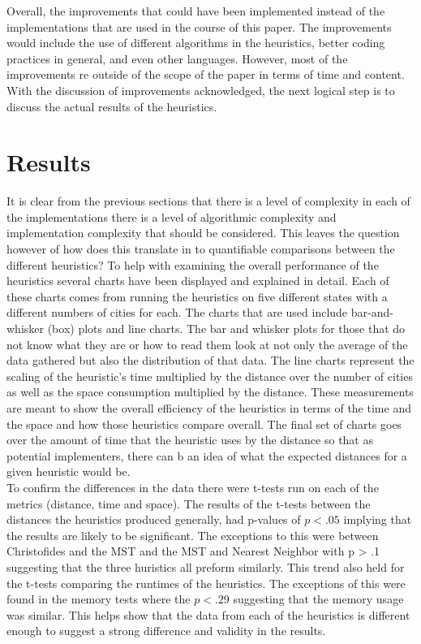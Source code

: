 \documentclass[midd]{thesis}
\newcommand{\tab}{\hspace*{2em}}
\begin{document}
\tab Overall, the improvements that could have been implemented instead of the implementations that are used in the course of this paper. The improvements would include the use of different algorithms in the heuristics, better coding practices in general, and even other languages. However, most of the improvements re outside of the scope of the paper in terms of time and content. With the discussion of improvements acknowledged, the next logical step is to discuss the actual results of the heuristics.

\chapter{Results}
\tab It is clear from the previous sections that there is a level of complexity in each of the implementations there is a level of algorithmic complexity and implementation complexity that should be considered. This leaves the question however of how does this translate in to quantifiable comparisons between the different heuristics? To help with examining the overall performance of the heuristics several charts have been displayed and explained in detail. Each of these charts comes from running the heuristics on five different states with a different numbers of cities for each. The charts that are used include bar-and-whisker (box) plots and line charts. The bar and whisker plots for those that do not know what they are or how to read them look at not only the average of the data gathered but also the distribution of that data. The line charts represent the scaling of the heuristic's time multiplied by the distance over the number of cities as well as the space consumption multiplied by the distance. These measurements are meant to show the overall efficiency of the heuristics in terms of the time and the space and how those heuristics compare overall. The final set of charts goes over the amount of time that the heuristic uses by the distance so that as potential implementers, there can b an idea of what the expected distances for a given heuristic would be.\\
\tab To confirm the differences in the data there were t-tests run on each of the metrics (distance, time and space). The results of the t-tests between the distances the heuristics produced generally, had p-values of  $p < .05$ implying that the results are likely to be significant. The exceptions to this were between Christofides and the MST and the MST and Nearest Neighbor with p > .1 suggesting that the three huristics all preform similarly. This trend also held for the t-tests comparing the runtimes of the heuristics. The exceptions of this were found in the memory tests where the $p < .29$ suggesting that the memory usage was similar.  This helps show that the data from each of the heuristics is different enough to suggest a strong difference and validity in the results.\\
\end{document}
